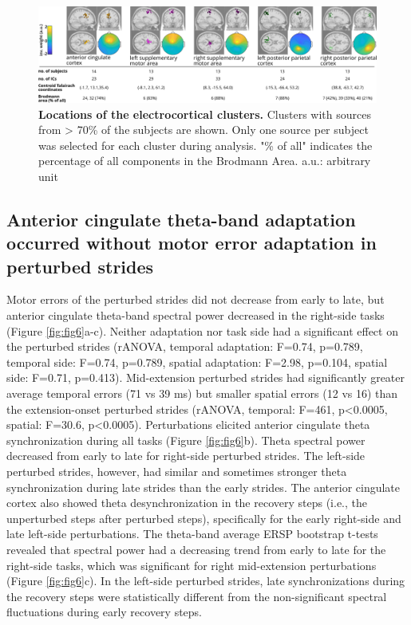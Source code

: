 \documentclass[../thesis_seyed.tex]{subfiles}
\begin{document}
\begin{figure}[!ht]
\centerline{\includegraphics{../img/05_dipole locations_70p.jpg}}
\caption{\textbf{Locations of the electrocortical clusters.} Clusters with sources from > 70\% of the subjects are shown. Only one source per subject was selected for each cluster during analysis. "\% of all" indicates the percentage of all components in the Brodmann Area. a.u.: arbitrary unit}
\label{fig:fig5}
\end{figure}

\subsection{Anterior cingulate theta-band adaptation occurred without motor error adaptation in perturbed strides}
Motor errors of the perturbed strides did not decrease from early to late, but anterior cingulate theta-band spectral power decreased in the right-side tasks (Figure \ref{fig:fig6}a-c). Neither adaptation nor task side had a significant effect on the perturbed strides (rANOVA, temporal adaptation: F=0.74, p=0.789, temporal side: F=0.74, p=0.789, spatial adaptation: F=2.98, p=0.104, spatial side: F=0.71, p=0.413). Mid-extension perturbed strides had significantly greater average temporal errors (71 vs 39 ms) but smaller spatial errors (12\textdegree{} vs 16\textdegree{}) than the extension-onset {perturbed} strides (rANOVA, temporal: F=461, p<0.0005, spatial: F=30.6, p<0.0005). Perturbations elicited anterior cingulate theta synchronization during all tasks (Figure \ref{fig:fig6}b). Theta spectral power decreased from early to late for right-side perturbed strides. The left-side perturbed strides, however, had similar and sometimes stronger theta synchronization during late strides than the early strides. The anterior cingulate cortex also showed theta desynchronization in the recovery steps (i.e., the unperturbed steps after perturbed steps), specifically for the early right-side and late left-side perturbations. The theta-band average ERSP bootstrap t-tests revealed that spectral power {had a decreasing trend from early to late for the} {right-side tasks, which was significant for right mid-extension perturbations} (Figure \ref{fig:fig6}c). In the left-side perturbed strides, late synchronizations during the recovery steps were statistically different from the non-significant spectral fluctuations during early recovery steps.
\end{document}
